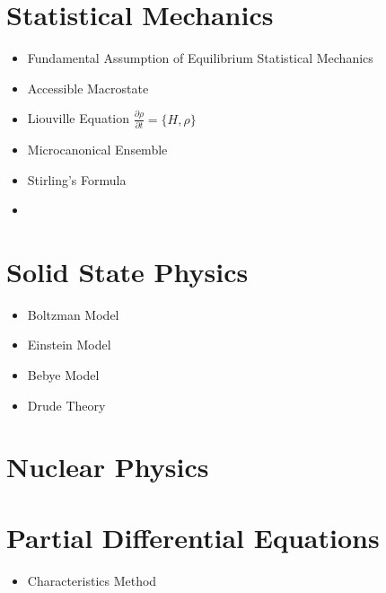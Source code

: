 \documentclass[10pt]{article}
\begin{document}
\section{Statistical Mechanics}
\begin{itemize}
	\item Fundamental Assumption of Equilibrium Statistical Mechanics
	\item Accessible Macrostate
	\item Liouville Equation $\frac{\partial \rho}{\partial t}=\{H,\rho\}$
	\item Microcanonical Ensemble
	\item Stirling's Formula
	\item
\end{itemize}
\begin{refsection}
	\nocite{kittel1998thermal}
\printbibliography[heading=subbibliography,title={Recommended Books}]
\end{refsection}

\section{Solid State Physics}
\begin{itemize}
	\item Boltzman Model
	\item Einstein Model
	\item Bebye Model
	\item Drude Theory
\end{itemize}
\begin{refsection}
	\nocite{kittel2005introduction}
\printbibliography[heading=subbibliography,title={Recommended Books}]
\end{refsection}

\section{Nuclear Physics}

\section{Partial Differential Equations}
\begin{itemize}
	\item Characteristics Method
\end{itemize}
\begin{refsection}
	\nocite{salsa2016equazioni}
	\nocite{salsa2016partial}
\printbibliography[heading=subbibliography]
\end{refsection}
\end{document}
